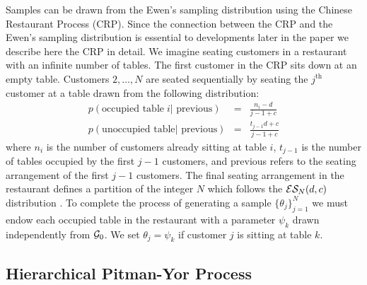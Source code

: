 Samples can be drawn from the Ewen's sampling distribution using the Chinese Restaurant Process (CRP).  Since the connection between the CRP and the Ewen's sampling distribution is essential to developments later in the paper we describe here the CRP in detail. We imagine seating customers in a restaurant with an infinite number of tables. The first customer in the CRP sits down at an empty table.  Customers $2, \dots ,N$ are seated sequentially by seating the $j^{\mathrm{th}}$ customer at a table drawn from the following distribution:
%
\begin{eqnarray*}
p(\textrm{occupied table}\; i |\textrm{ previous}) &=& \frac{n_i - d}{j-1+ c}\\
p(\textrm{unoccupied table} | \textrm{ previous}) &=& \frac{t_{j-1}d +c}{j-1+c}
\end{eqnarray*}
%
where $n_i$ is the number of customers already sitting at table $i$, $t_{j-1}$ is the number of tables occupied by the first $j-1$ customers, and previous refers to the seating arrangement of the first $j-1$ customers.  The final seating arrangement in the restaurant defines a partition of the integer $N$ which follows the $\ES_N(d,c)$ distribution \cite{Pitman1995}.  To complete the process of generating a sample $\{ \theta_j \}_{j = 1}^N$ we must endow each occupied table in the restaurant with a parameter $\psi_k$ drawn independently from $\G_0$.  We set $\theta_j = \psi_k$ if customer $j$ is sitting at table $k$.


\subsection{Hierarchical Pitman-Yor Process}

